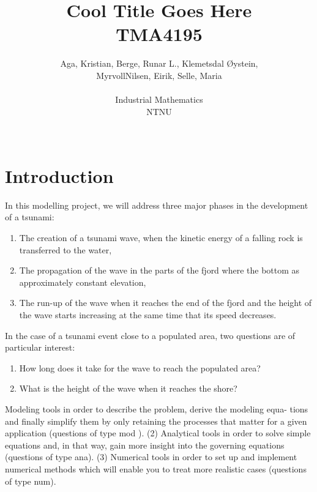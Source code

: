 \documentclass[12pt]{article}
\author{Aga, Kristian, Berge, Runar L., Klemetsdal Øystein,\\
	MyrvollNilsen, Eirik, Selle, Maria\\\\
	Industrial Mathematics\\
	NTNU \\\\
}
\title{Cool Title Goes Here \\     
	TMA4195}
\begin{document}
\maketitle
\clearpage


\chapter{Introduction} %

\label{Chapter1} %


\newcommand{\keyword}[1]{\textbf{#1}}
\newcommand{\tabhead}[1]{\textbf{#1}}
\newcommand{\code}[1]{\texttt{#1}}
\newcommand{\file}[1]{\texttt{\bfseries#1}}
\newcommand{\option}[1]{\texttt{\itshape#1}}


In this modelling project, we will address three major phases in the development of a tsunami:
\begin{enumerate}[label = \emph{(\roman*)}]
    \item    The creation of a tsunami wave, when the kinetic energy of a falling rock is transferred to the
             water,
    \item    The propagation of the wave in the parts of the fjord where the bottom as approximately constant
             elevation,
    \item    The run-up of the wave when it reaches the end of the fjord and the height of the wave starts
             increasing at the same time that its speed decreases.
\end{enumerate}

In the case of a tsunami event close to a populated area, two questions are of particular interest:
\begin{enumerate}[label = \emph{(\roman*)}]
    \item    How long does it take for the wave to reach the populated area?
    \item    What is the height of the wave when it reaches the shore?
\end{enumerate}

Modeling tools in order to describe the problem, derive the modeling equa-
tions and finally simplify them by only retaining the processes that matter
for a given application (questions of type mod ).
(2) Analytical tools in order to solve simple equations and, in that way, gain
more insight into the governing equations (questions of type ana).
(3) Numerical tools in order to set up and implement numerical methods which
will enable you to treat more realistic cases (questions of type num).
\end{document}
